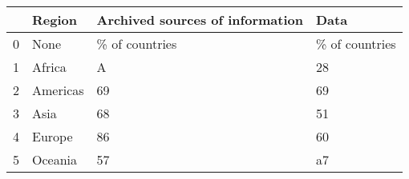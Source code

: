 \begin{tabular}{llll}
\toprule
{} &    Region & Archived sources of information &            Data \\
\midrule
0 &      None &                  \% of countries &  \% of countries \\
1 &    Africa &                               A &              28 \\
2 &  Americas &                              69 &              69 \\
3 &      Asia &                              68 &              51 \\
4 &    Europe &                              86 &              60 \\
5 &   Oceania &                              57 &              a7 \\
\bottomrule
\end{tabular}
